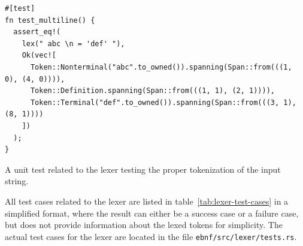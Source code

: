 \documentclass[english,engineering]{wizthesis}
\begin{document}
\begin{listing}[H]
  \begin{verbatim}
#[test]
fn test_multiline() {
  assert_eq!(
    lex(" abc \n = 'def' "),
    Ok(vec![
      Token::Nonterminal("abc".to_owned()).spanning(Span::from(((1, 0), (4, 0)))),
      Token::Definition.spanning(Span::from(((1, 1), (2, 1)))),
      Token::Terminal("def".to_owned()).spanning(Span::from(((3, 1), (8, 1))))
    ])
  );
}
  \end{verbatim}
  \caption{A unit test related to the lexer testing the proper tokenization of
  the input string.}
  \label{lst:lexer-unit-test}
\end{listing}

All test cases related to the lexer are listed in
table~\ref{tab:lexer-test-cases} in a simplified format, where the result can
either be a success case or a failure case, but does not provide information
about the lexed tokens for simplicity. The actual test cases for the lexer
are located in the file \texttt{ebnf/src/lexer/tests.rs}.
\end{document}
